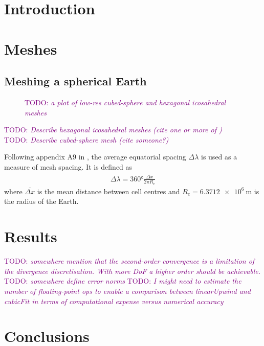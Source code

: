 \documentclass[times]{elsarticle}
\newcommand{\TODO}[1]{\textcolor{purple}{TODO: \emph{#1}}}
\begin{document}
\section{Introduction}


\section{Meshes}


\subsection{Meshing a spherical Earth}

\begin{figure}
	\caption{\TODO{a plot of low-res cubed-sphere and hexagonal icosahedral meshes}}
\end{figure}

\TODO{Describe hexagonal icosahedral meshes (cite one or more of \citep{thuburn2014,heikes-randall1995a,heikes-randall1995b})} \\
\TODO{Describe cubed-sphere mesh (cite someone?)}

Following appendix A9 in \citep{lauritzen2014}, the average equatorial spacing $\Delta \lambda$ is used as a measure of mesh spacing.  It is defined as
\begin{align}
	\Delta \lambda = \ang{360} \frac{\overline{\Delta x}}{2 \pi R_e}
\end{align}
where $\overline{\Delta x}$ is the mean distance between cell centres and $R_e = \SI{6.3712e6}{\meter}$ is the radius of the Earth.



\section{Results}
\label{sec:results}

\TODO{somewhere mention that the second-order convergence is a limitation of the divergence discretisation.  With more DoF a higher order should be achievable.} \\
\TODO{somewhere define error norms}
\TODO{I might need to estimate the number of floating-point ops to enable a comparison between linearUpwind and cubicFit in terms of computational expense versus numerical accuracy}





\section{Conclusions}
\end{document}
